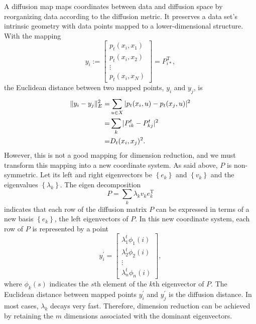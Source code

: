 A diffusion map maps coordinates between data and diffusion space by reorganizing data according to the diffusion metric. It preserves a data set's intrinsic geometry with data points mapped to a lower-dimensional structure. With the mapping 
\begin{equation}
	y_i := \begin{bmatrix}
		p_t(x_i, x_{1}) \\
		p_t(x_i, x_{2}) \\
		\vdots \\
		p_t(x_i, x_{N})
	\end{bmatrix}=P_{i\ast}^{\operatorname{T}},
\end{equation}
the Euclidean distance between two mapped points, $y_i$ and $y_j$, is
\begin{align}
	\lVert y_i-y_j\rVert_E^2=&\sum_{u\in X} |p_t(x_i,u)-p_t(x_j,u)|^2\notag\\
	                        =&\sum_k |P_{ik}^t-P_{kj}^t|^2\notag\\
	                        =&D_t(x_i,x_j)^2.
\end{align}
However, this is not a good mapping for dimension reduction, and we must transform this mapping into a new coordinate system. As said above, $P$ is non-symmetric. Let its left and right eigenvectors be $\left\{e_k\right\}$ and $\left\{v_k\right\}$ and the eigenvalues $\left\{\lambda_k\right\}$. The eigen decomposition
\begin{equation}
	P=\sum_k\lambda_kv_ke_k^{\operatorname{T}}
\end{equation}
indicates that each row of the diffusion matrix $P$ can be expressed in terms of a new basis $\left\{e_k\right\}$, the left eigenvectors of $P$. In this new coordinate system, each row of $P$ is represented by a point
\begin{equation}
	y_i^\prime=\begin{bmatrix}
		\lambda_1^t\phi_1(i) \\
		\lambda_2^t\phi_2(i) \\
		\vdots \\
		\lambda_n^t\phi_n(i)
	\end{bmatrix},
\end{equation}
where $\phi_k(s)$ indicates the $s$th element of the $k$th eigenvector of $P$. The Euclidean distance between mapped points $y_i^\prime$ and $y_j^\prime$ is the diffusion distance. In most cases, $\lambda_k$ decays very fast. Therefore, dimension reduction can be achieved by retaining the $m$ dimensions associated with the dominant eigenvectors.